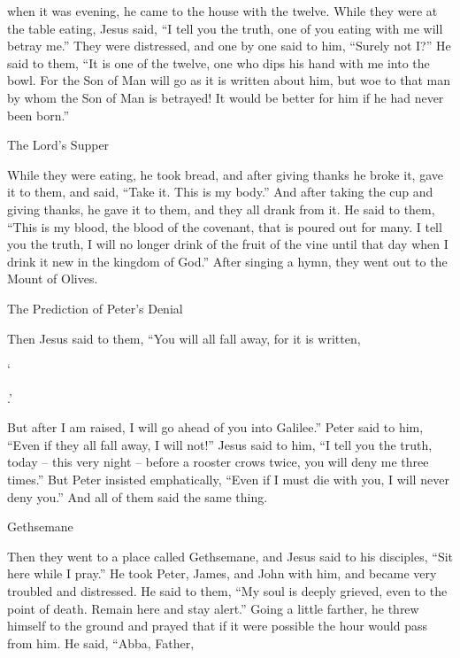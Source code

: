 {when it was
evening,
he came
to the house with
the twelve.
While
they
were at the table
eating,
Jesus
said,
“I tell
you
the truth,
one
of
you
eating
with
me
will betray
me.”
They were distressed,
and
one
by
one
said
to him,
“Surely not
I?”
He said
to them,
“It is one
of the twelve,
one who dips
his hand with
me
into
the bowl.
For
the Son
of Man
will go
as
it is written
about
him,
but
woe
to that
man
by
whom
the Son
of Man
is betrayed! It would be better
for him
if
he had
never
been born.”
\par }{\SH The Lord’s Supper
\par }{\PP {}While
they
were eating,
he took
bread,
and after giving thanks
he broke
it, gave
it to them,
and
said,
“Take
it. This
is
my
body.”
And
after taking
the cup
and giving thanks,
he gave
it to them,
and
they
all
drank
from
it.
He
said
to them,
“This
is
my
blood,
the blood of the covenant,
that is poured out
for
many.
I tell
you
the truth,
I will
no longer
drink
of
the fruit
of the vine
until
that
day
when
I drink
it
new
in
the kingdom
of God.”
After singing a hymn,
they went out
to
the Mount
of Olives.
\par }{\SH The Prediction of Peter’s Denial
\par }{\PP {}Then
Jesus
said
to them,
“You
will
all
fall away,
for
it is written,
\par }{\Q ‘{}
\par }{.’
\par }{\PI {}But
after
I
am raised,
I will go ahead
of you
into
Galilee.”
Peter
said
to him,
“Even if
they
all
fall away,
I
will not!”
Jesus
said
to him,
“I tell
you
the truth,
today
– this
very night
– before
a rooster
crows
twice,
you will deny
me
three times.”
But
Peter insisted
emphatically, “Even if
I
must
die with
you,
I will
never
deny
you.”
And
all of them
said
the same thing.
\par }{\SH Gethsemane
\par }{\PP {}Then
they went
to
a place
called
Gethsemane,
and
Jesus said
to his
disciples,
“Sit
here
while
I pray.”
He
took
Peter,
James,
and
John
with
him,
and
became
very troubled
and
distressed.
He
said
to them,
“My
soul
is
deeply grieved,
even to the point
of death.
Remain
here
and
stay alert.”
Going
a little
farther,
he threw
himself to
the ground
and
prayed
that
if
it were
possible
the hour
would pass
from
him.
He
said,
“Abba,
Father,
}
